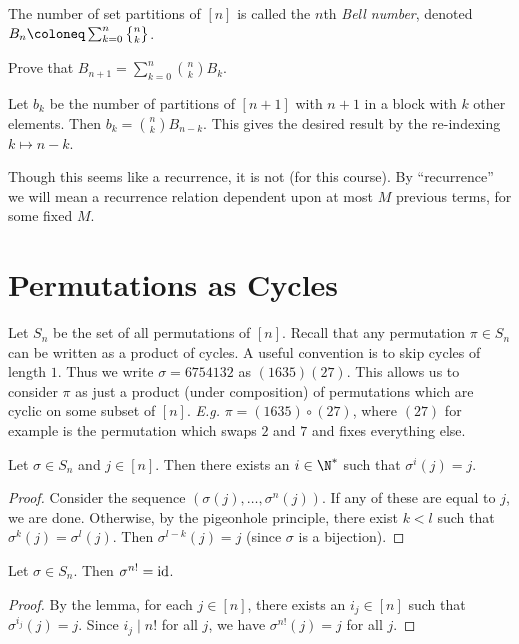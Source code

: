 \begin{definition*} \label{def:bell}
    The number of set partitions of $[n]$ is called the $n$th \emph{Bell
    number}, denoted $B_n \coloneq \sum_{k=0}^{n} \stirling nk$.
\end{definition*}

\begin{exercise*}
    Prove that $B_{n+1} = \sum_{k=0}^{n} \binom{n}{k} B_k$.
\end{exercise*}
\begin{solution}
    Let $b_k$ be the number of partitions of $[n+1]$ with $n+1$ in a block
    with $k$ other elements.
    Then $b_k = \binom{n}{k} B_{n-k}$.
    This gives the desired result by the re-indexing $k \mapsto n-k$.
\end{solution}
Though this seems like a recurrence, it is not (for this course).
By ``recurrence'' we will mean a recurrence relation dependent upon at most
$M$ previous terms, for some fixed $M$.

\section{Permutations as Cycles} \label{sec:perm:cycles}
Let $S_n$ be the set of all permutations of $[n]$.
Recall that any permutation $\pi \in S_n$ can be written as a product of
cycles.
A useful convention is to skip cycles of length $1$.
Thus we write $\sigma = 6754132$ as $(1635)(27)$.
This allows us to consider $\pi$ as just a product (under composition) of
permutations which are cyclic on some subset of $[n]$.
\textit{E.g.} $\pi = (1635) \circ (27)$, where $(27)$ for example is the
permutation which swaps $2$ and $7$ and fixes everything else.

\begin{lemma}
    Let $\sigma \in S_n$ and $j \in [n]$.
    Then there exists an $i \in \N^*$ such that $\sigma^i(j) = j$.
\end{lemma}
\begin{proof}
    Consider the sequence $(\sigma(j), \dots, \sigma^n(j))$.
    If any of these are equal to $j$, we are done.
    Otherwise, by the pigeonhole principle, there exist $k < l$ such that
    $\sigma^k(j) = \sigma^l(j)$.
    Then $\sigma^{l-k}(j) = j$ (since $\sigma$ is a bijection).
\end{proof}
\begin{corollary}
    Let $\sigma \in S_n$.
    Then $\sigma^{n!} = \mathrm{id}$.
\end{corollary}
\begin{proof}
    By the lemma, for each $j \in [n]$, there exists an $i_j \in [n]$ such
    that $\sigma^{i_j}(j) = j$.
    Since $i_j \mid n!$ for all $j$, we have $\sigma^{n!}(j) = j$ for all
    $j$.
\end{proof}

